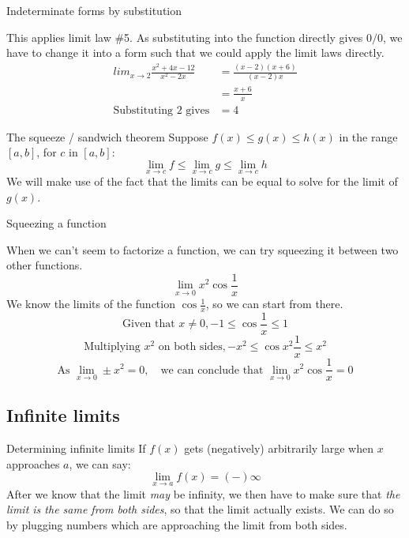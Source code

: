\documentclass{article}
\begin{document}
\begin{example}
    Indeterminate forms by substitution

    This applies limit law \#5. As substituting into the function directly gives $0/0$, we have to change it into a form such that we could apply the limit laws directly.
    \begin{align*}
        lim_{x\to 2}\frac{x^2+4x-12}{x^2-2x} & =\frac{(x-2)(x+6)}{(x-2)x} \\
                                             & =\frac{x+6}{x}             \\
        \text{Substituting 2 gives}          & =4
    \end{align*}
\end{example}


\begin{theorem}
    {The squeeze / sandwich theorem}
    Suppose $f(x)\le g(x) \le h(x)$ in the range $[a, b]$, for $c$ in $[a, b]$:
    \[\lim_{x\to c}f \le \lim_{x\to c}g \le \lim_{x\to c}h\]
    We will make use of the fact that the limits can be equal to solve for the limit of $g(x)$.
\end{theorem}

\begin{example}
    Squeezing a function

    When we can't seem to factorize a function, we can try squeezing it between two other functions.
    \[\lim_{x\to 0}x^2\cos\frac{1}{x}\]
    We know the limits of the function $\cos \frac{1}{x}$, so we can start from there.
    \[\text{Given that }x\ne 0, -1\le \cos \frac{1}{x} \le 1\]
    \[\text{Multiplying }x^2\text{ on both sides},-x^2\le \cos x^2\frac{1}{x} \le x^2\]
    \[\text{As }\lim_{x\to 0}\pm x^2=0,\quad\text{we can conclude that }\lim_{x\to 0}x^2\cos\frac{1}{x}=0\]
\end{example}

\subsection{Infinite limits}
\begin{knBox}
    {Determining infinite limits}
    If $f(x)$ gets (negatively) arbitrarily large when $x$ approaches $a$, we can say:
    \[\lim_{x\to a}f(x)=(-)\infty\]
    After we know that the limit \emph{may} be infinity, we then have to make sure that \emph{the limit is the same from both sides}, so that the limit actually exists. We can do so by plugging numbers which are approaching the limit from both sides.
\end{knBox}
\end{document}
